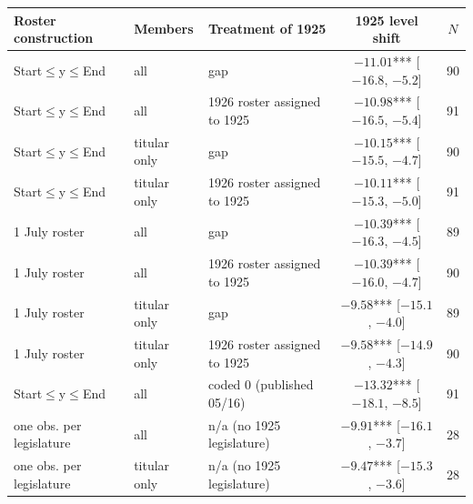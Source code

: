 \begin{tabular}{lllcc}
\toprule
Roster construction & Members & Treatment of 1925 & 1925 level shift & $N$ \\
\midrule
Start$\leq$y$\leq$End & all & gap & $-11.01$*** [$-16.8$, $-5.2$] & 90 \\
Start$\leq$y$\leq$End & all & 1926 roster assigned to 1925 & $-10.98$*** [$-16.5$, $-5.4$] & 91 \\
Start$\leq$y$\leq$End & titular only & gap & $-10.15$*** [$-15.5$, $-4.7$] & 90 \\
Start$\leq$y$\leq$End & titular only & 1926 roster assigned to 1925 & $-10.11$*** [$-15.3$, $-5.0$] & 91 \\
1 July roster & all & gap & $-10.39$*** [$-16.3$, $-4.5$] & 89 \\
1 July roster & all & 1926 roster assigned to 1925 & $-10.39$*** [$-16.0$, $-4.7$] & 90 \\
1 July roster & titular only & gap & $-9.58$*** [$-15.1$, $-4.0$] & 89 \\
1 July roster & titular only & 1926 roster assigned to 1925 & $-9.58$*** [$-14.9$, $-4.3$] & 90 \\
Start$\leq$y$\leq$End & all & coded 0 (published 05/16) & $-13.32$*** [$-18.1$, $-8.5$] & 91 \\
one obs. per legislature & all & n/a (no 1925 legislature) & $-9.91$*** [$-16.1$, $-3.7$] & 28 \\
one obs. per legislature & titular only & n/a (no 1925 legislature) & $-9.47$*** [$-15.3$, $-3.6$] & 28 \\
\bottomrule
\end{tabular}

